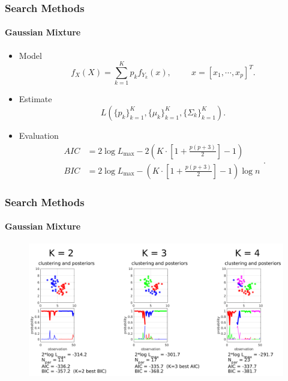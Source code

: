 \documentclass[aspectratio=169,10pt,t]{beamer}
\begin{document}
\begin{frame}[t]
	\frametitle{Search Methods}
	\framesubtitle{Gaussian Mixture}


	\begin{itemize}
		\item Model\\
			\[
				f _{X} \left( X \right)  =
				\sum^{K}_{k=1} 
				p_k f _{Y_k}  \left( x \right) ,
				\hspace{1cm}
				x = \left[ x_1, \cdots, x_p \right] ^{T}
			.\] 
			\pause
		\item Estimate 
			\[
				L  \left( \{ p_k \} ^{K}_{k=1},
					\{ \mu_k \}^{K}_{k=1},
					\{ \Sigma_{k} \}^{K}_{k=1}
				\right) 
			.\] 
			\pause
		\item Evaluation
			\[
				\begin{aligned}
					AIC &= 2 \log L _{\max} - 2
					\left( K \cdot  \left[ 1 + \frac{p \left( p+3 \right) }{2}  \right] -1  \right) \\
					BIC &= 2 \log L _{\max} -
					\left(  K \cdot  \left[ 1 + \frac{p \left( p+3 \right) }{2}  \right] -1  \right) 
					\log n
				\end{aligned}
			.\] 

	\end{itemize}


\end{frame}

\begin{frame}[t]
	\frametitle{Search Methods}
	\framesubtitle{Gaussian Mixture}

	\begin{figure}[h]
		\centering
		\includegraphics[width=0.8\linewidth]{images/gmm.png}
	\end{figure}

\end{frame}
\end{document}
